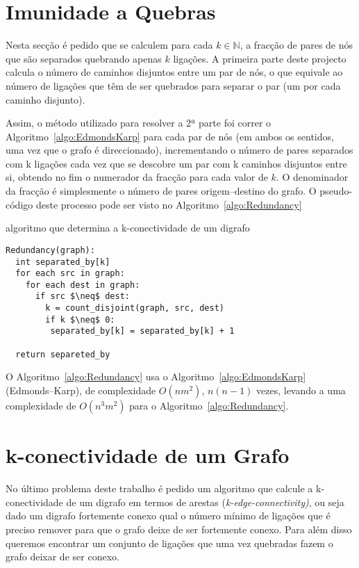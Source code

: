 \documentclass[10pt,a4paper]{article}
\begin{document}
\section{Imunidade a Quebras}
Nesta secção é pedido que se calculem para cada $k \in \mathbb{N} $, a fracção de pares de nós que são separados quebrando apenas $k$ ligações. A primeira parte deste projecto calcula o número de caminhos disjuntos entre um par de nós, o que equivale ao número de ligações que têm de ser quebrados para separar o par (um por cada caminho disjunto). 

Assim, o método utilizado para resolver a 2ª parte foi correr o Algoritmo~\ref{algo:EdmondsKarp} para cada par de nós (em ambos os sentidos, uma vez que o grafo é direccionado), incrementando o número de pares separados com k ligações cada vez que se descobre um par com k caminhos disjuntos entre si, obtendo no fim o numerador da fracção para cada valor de $k$. O denominador da fracção é simplesmente o número de pares origem--destino do grafo. O pseudo-código deste processo pode ser visto no Algoritmo~\ref{algo:Redundancy} 

\begin{algorithm}[h]
\caption{algoritmo que determina a k-conectividade de um digrafo}
\label{algo:Redundancy}
\begin{lstlisting}[linewidth=0.95\linewidth, mathescape]
Redundancy(graph):
  int separated_by[k]
  for each src in graph:
    for each dest in graph:
      if src $\neq$ dest:
        k = count_disjoint(graph, src, dest)
        if k $\neq$ 0:
         separated_by[k] = separated_by[k] + 1 

  return separeted_by
\end{lstlisting}
\end{algorithm}

O Algoritmo~\ref{algo:Redundancy} usa o Algoritmo~\ref{algo:EdmondsKarp} (Edmonds--Karp), de complexidade $O(n m^2)$, $n(n-1)$ vezes, levando a uma complexidade de $O(n^3 m^2)$ para o Algoritmo~\ref{algo:Redundancy}.

\section{k-conectividade de um Grafo}
No último problema deste trabalho é pedido um algoritmo que calcule a k-conectividade de um digrafo em termos de arestas (\textit{k-edge-connectivity)}, ou seja dado um digrafo fortemente conexo qual o número mínimo de ligações que é preciso remover para que o grafo deixe de ser fortemente conexo. Para além disso queremos encontrar um conjunto de ligações que uma vez quebradas fazem o grafo deixar de ser conexo.
\end{document}
